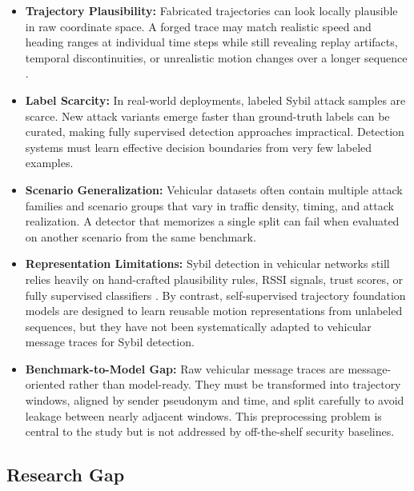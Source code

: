 \documentclass[12pt]{article}
\begin{document}
\begin{itemize}
    \item \textbf{Trajectory Plausibility:} Fabricated trajectories can look locally plausible in raw coordinate space. A forged trace may match realistic speed and heading ranges at individual time steps while still revealing replay artifacts, temporal discontinuities, or unrealistic motion changes over a longer sequence \cite{so2018integrating}.

    \item \textbf{Label Scarcity:} In real-world deployments, labeled Sybil attack samples are scarce. New attack variants emerge faster than ground-truth labels can be curated, making fully supervised detection approaches impractical. Detection systems must learn effective decision boundaries from very few labeled examples.

    \item \textbf{Scenario Generalization:} Vehicular datasets often contain multiple attack families and scenario groups that vary in traffic density, timing, and attack realization. A detector that memorizes a single split can fail when evaluated on another scenario from the same benchmark.

    \item \textbf{Representation Limitations:} Sybil detection in vehicular networks still relies heavily on hand-crafted plausibility rules, RSSI signals, trust scores, or fully supervised classifiers \cite{so2018integrating,yao2019multi,baza2022detecting,azam2022collaborative}. By contrast, self-supervised trajectory foundation models are designed to learn reusable motion representations from unlabeled sequences, but they have not been systematically adapted to vehicular message traces for Sybil detection.

    \item \textbf{Benchmark-to-Model Gap:} Raw vehicular message traces are message-oriented rather than model-ready. They must be transformed into trajectory windows, aligned by sender pseudonym and time, and split carefully to avoid leakage between nearly adjacent windows. This preprocessing problem is central to the study but is not addressed by off-the-shelf security baselines.
\end{itemize}

\subsection{Research Gap}
\end{document}
